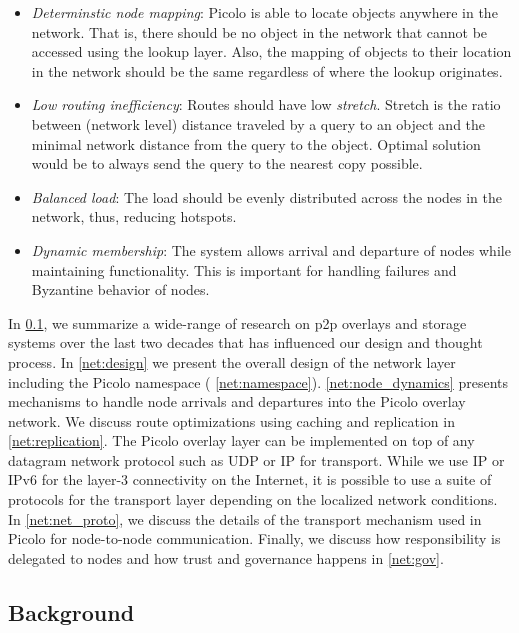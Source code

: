 \begin{itemize}
    \item {\em Determinstic node mapping}: \textsf{Picolo} is able to locate objects anywhere in the network. That is, there
        should be no object in the network that cannot be accessed using the lookup layer. Also, the mapping of objects
        to their location in the network should be the same regardless of where the lookup originates.
    \item {\em Low routing inefficiency}: Routes should have low {\em stretch}. Stretch is the ratio between (network
        level) distance traveled by a query to an object and the minimal network distance from the query to the object.
        Optimal solution would be to always send the query to the nearest copy possible.
    \item {\em Balanced load}: The load should be evenly distributed across the nodes in the network, thus, reducing
        hotspots.
    \item {\em Dynamic membership}: The system allows arrival and departure of nodes while maintaining functionality.
        This is important for handling failures and Byzantine behavior of nodes.
\end{itemize}
In \cref{net:background}, we summarize a wide-range of research on p2p overlays and storage systems
over the last two decades that has influenced our design and thought process. In \cref{net:design} we
present the overall design of the network layer including the \textsf{Picolo} namespace ( \cref{net:namespace}). \cref{net:node_dynamics} presents mechanisms to handle node arrivals and departures into the \textsf{Picolo} overlay network. We discuss route optimizations using caching and replication in \cref{net:replication}.
\newline\newline
The \textsf{Picolo} overlay layer can be implemented on top of any datagram network protocol such as UDP or IP for transport.
While we use IP or IPv6 for the layer-3 connectivity on the Internet, it is possible to use a suite of protocols for the
transport layer depending on the localized network conditions. In \cref{net:net_proto}, we discuss the details of
the transport mechanism used in \textsf{Picolo} for node-to-node communication. Finally, we discuss how responsibility is delegated
to nodes and how trust and governance happens in \cref{net:gov}.

\subsection{Background} \label{net:background}

